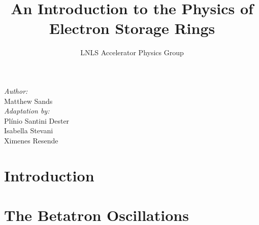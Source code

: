 


\title{An Introduction to the Physics of Electron Storage Rings}
\author{LNLS Accelerator Physics Group}


\maketitle
\begin{flushright}
	\textit{Author:}\\
    \vspace{1mm}
    Matthew Sands\\
    \vspace{5mm}
    \textit{Adaptation by:}\\
    \vspace{1mm}
	Pl\'inio Santini Dester\\
	Isabella Stevani\\
	Ximenes Resende
\end{flushright}

\thispagestyle{empty}

\newpage
\tableofcontents

\newpage


\chapter{Introduction} \label{ch:1}
	
    
    
    
\chapter{The Betatron Oscillations} \label{ch:2}
	
    
    
    
    
    
    
    
	
	
	
    

